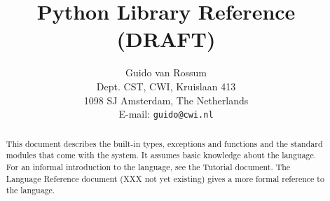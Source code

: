 

\newcommand{\itembreak}{
	\mbox{}\\*[0mm]
}

\newcommand{\funcitem}[2]{\item[#1(#2)]}

\newcommand{\excitem}[2]{
\item[#1 = {\tt '#2'}]
\itembreak
}

\title{\bf
	Python Library Reference \\
	(DRAFT)
}

\author{
	Guido van Rossum \\
	Dept. CST, CWI, Kruislaan 413 \\
	1098 SJ Amsterdam, The Netherlands \\
	E-mail: {\tt guido@cwi.nl}
}




\maketitle

\begin{abstract}

\noindent
This document describes the built-in types, exceptions and functions and
the standard modules that come with the {\Python} system.
It assumes basic knowledge about the {\Python} language.
For an informal introduction to the language, see the Tutorial document.
The Language Reference document (XXX not yet existing)
gives a more formal reference to the language.

\end{abstract}

\pagebreak

\tableofcontents

\pagebreak







